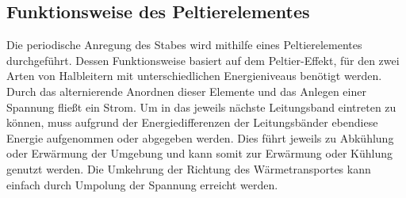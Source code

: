 \subsection{Funktionsweise des Peltierelementes}
Die periodische Anregung des Stabes wird mithilfe eines Peltierelementes durchgeführt.
Dessen Funktionsweise basiert auf dem Peltier-Effekt, für den zwei Arten von Halbleitern mit unterschiedlichen Energieniveaus benötigt werden.
Durch das alternierende Anordnen dieser Elemente und das Anlegen einer Spannung fließt ein Strom.
Um in das jeweils nächste Leitungsband eintreten zu können, muss aufgrund der Energiedifferenzen der Leitungsbänder ebendiese Energie aufgenommen oder abgegeben werden.
Dies führt jeweils zu Abkühlung oder Erwärmung der Umgebung und kann somit zur Erwärmung oder Kühlung genutzt werden.
Die Umkehrung der Richtung des Wärmetransportes kann einfach durch Umpolung der Spannung erreicht werden.

\label{sec:Theorie}

